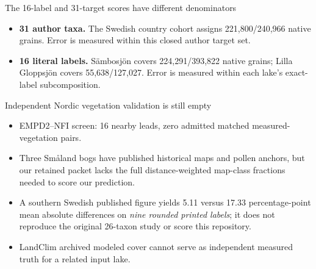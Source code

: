 \begin{frame}{The 16-label and 31-target scores have different denominators}
\small
\begin{itemize}
\item \textbf{31 author taxa.} The Swedish country cohort assigns 221,800/240,966 native grains. Error is measured within this closed author target set.
\item \textbf{16 literal labels.} S\"ambosj\"on covers 224,291/393,822 native grains; Lilla Gloppsj\"on covers 55,638/127,027. Error is measured within each lake's exact-label subcomposition.
\end{itemize}
\end{frame}

\begin{frame}{Independent Nordic vegetation validation is still empty}
\small
\begin{itemize}
\item EMPD2--NFI screen: 16 nearby leads, zero admitted matched measured-vegetation pairs.
\item Three Sm\aa land bogs have published historical maps and pollen anchors, but our retained packet lacks the full distance-weighted map-class fractions needed to score our prediction.
\item A southern Swedish published figure yields 5.11 versus 17.33 percentage-point mean absolute differences on \emph{nine rounded printed labels}; it does not reproduce the original 26-taxon study or score this repository.
\item LandClim archived modeled cover cannot serve as independent measured truth for a related input lake.
\end{itemize}
\end{frame}

